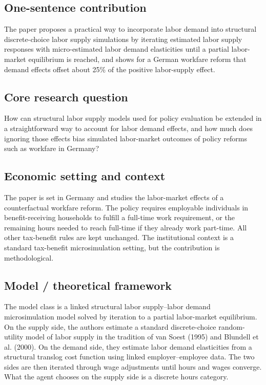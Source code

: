 \documentclass[11pt,a4paper]{article}
\begin{document}
\subsection*{One-sentence contribution}
The paper proposes a practical way to incorporate labor demand into structural discrete-choice labor supply simulations by iterating estimated labor supply responses with micro-estimated labor demand elasticities until a partial labor-market equilibrium is reached, and shows for a German workfare reform that demand effects offset about 25\% of the positive labor-supply effect.

\subsection*{Core research question}
How can structural labor supply models used for policy evaluation be extended in a straightforward way to account for labor demand effects, and how much does ignoring those effects bias simulated labor-market outcomes of policy reforms such as workfare in Germany?

\subsection*{Economic setting and context}
The paper is set in Germany and studies the labor-market effects of a counterfactual workfare reform. The policy requires employable individuals in benefit-receiving households to fulfill a full-time work requirement, or the remaining hours needed to reach full-time if they already work part-time. All other tax-benefit rules are kept unchanged. The institutional context is a standard tax-benefit microsimulation setting, but the contribution is methodological.

\subsection*{Model / theoretical framework}
The model class is a linked structural labor supply–labor demand microsimulation model solved by iteration to a partial labor-market equilibrium. On the supply side, the authors estimate a standard discrete-choice random-utility model of labor supply in the tradition of van Soest (1995) and Blundell et al. (2000). On the demand side, they estimate labor demand elasticities from a structural translog cost function using linked employer–employee data. The two sides are then iterated through wage adjustments until hours and wages converge. What the agent chooses on the supply side is a discrete hours category.
\end{document}
